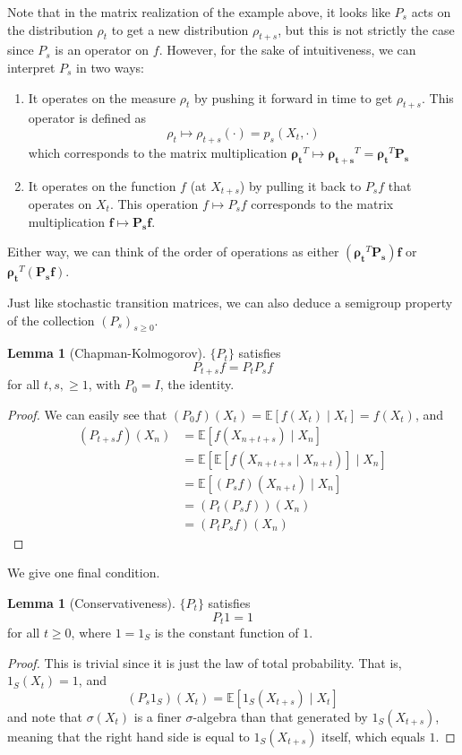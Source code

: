 \documentclass{article}
\theoremstyle{definition}
\newtheorem{lemma}[theorem]{Lemma}
\theoremstyle{remark}
\theoremstyle{definition}
\begin{document}
Note that in the matrix realization of the example above, it looks like $P_s$ acts on the distribution $\rho_t$ to get a new distribution $\rho_{t + s}$, but this is not strictly the case since $P_s$ is an operator on $f$. However, for the sake of intuitiveness, we can interpret $P_s$ in two ways: 
\begin{enumerate}
    \item It operates on the measure $\rho_t$ by pushing it forward in time to get $\rho_{t + s}$. This operator is defined as 
    \[\rho_t \mapsto \rho_{t + s}(\cdot) = p_s (X_t, \cdot)\]
    which corresponds to the matrix multiplication $\boldsymbol{\rho_t}^T \mapsto \boldsymbol{\rho_{t + s}}^T = \boldsymbol{\rho_{t}}^T \mathbf{P_s}$
    \item It operates on the function $f$ (at $X_{t + s}$) by pulling it back to $P_s f$ that operates on $X_t$. This operation $f \mapsto P_s f$ corresponds to the matrix multiplication $\mathbf{f} \mapsto \mathbf{P_s} \mathbf{f}$. 
\end{enumerate}
Either way, we can think of the order of operations as either $(\boldsymbol{\rho_t}^T \mathbf{P_s}) \mathbf{f}$ or $\boldsymbol{\rho_t}^T (\mathbf{P_s} \mathbf{f})$. 

Just like stochastic transition matrices, we can also deduce a semigroup property of the collection $(P_s)_{s \geq 0}$. 

\begin{lemma}[Chapman-Kolmogorov]
$\{P_t\}$ satisfies 
\[P_{t + s} f = P_t P_s f\]
for all $t, s, \geq 1$, with $P_0 = I$, the identity. 
\end{lemma}
\begin{proof}
We can easily see that $(P_0 f) (X_t) = \mathbb{E}[f(X_t) \mid X_t] = f(X_t)$, and 
\begin{align*}
    (P_{t + s} f) (X_n) & = \mathbb{E}[ f(X_{n + t + s}) \mid X_n] \\
    & = \mathbb{E} [ \mathbb{E}[ f(X_{n + t + s} \mid X_{n + t}) ] \mid X_n] \\
    & = \mathbb{E}[(P_s f) (X_{n + t}) \mid X_n] \\
    & = (P_t (P_s f))(X_n) \\
    & = (P_t P_s f) (X_n)
\end{align*}
\end{proof}

We give one final condition. 

\begin{lemma}[Conservativeness]
$\{P_t\}$ satisfies 
\[P_t 1 = 1\]
for all $t \geq 0$, where $1 = 1_S$ is the constant function of $1$. 
\end{lemma}
\begin{proof}
This is trivial since it is just the law of total probability. That is, $1_S (X_t) = 1$, and 
\[(P_s 1_S) (X_t) = \mathbb{E}[ 1_S (X_{t + s}) \mid X_t]\]
and note that $\sigma(X_t)$ is a finer $\sigma$-algebra than that generated by $1_S (X_{t + s})$, meaning that the right hand side is equal to $1_S (X_{t + s})$ itself, which equals $1$. 
\end{proof}
\end{document}
